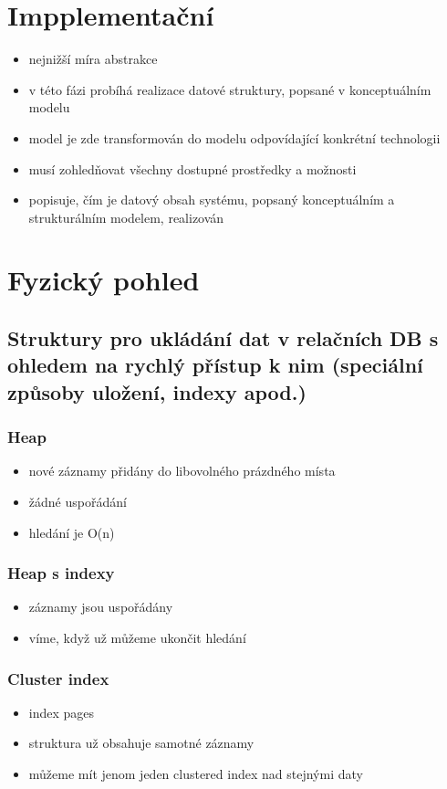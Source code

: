 \documentclass{szzclass}
\begin{document}
\section{Impplementační}
\begin{itemize}
  \item nejnižší míra abstrakce
  \item v této fázi probíhá realizace datové struktury, popsané v konceptuálním modelu
  \item model je zde transformován do modelu odpovídající konkrétní technologii
  \item musí zohledňovat všechny dostupné prostředky a možnosti
  \item popisuje, čím je datový obsah systému, popsaný konceptuálním a strukturálním modelem, realizován
\end{itemize}

\section{Fyzický pohled}
\subsection{Struktury pro ukládání dat v relačních DB s ohledem na rychlý přístup k nim (speciální způsoby uložení, indexy apod.)}
\subsubsection{Heap}
\begin{itemize}
  \item nové záznamy přidány do libovolného prázdného místa
  \item žádné uspořádání
  \item hledání je O(n)
\end{itemize}
\subsubsection{Heap s indexy}
\begin{itemize}
  \item záznamy jsou uspořádány
  \item víme, když už můžeme ukončit hledání
\end{itemize}
\subsubsection{Cluster index}
\begin{itemize}
  \item index pages
  \item struktura už obsahuje samotné záznamy
  \item můžeme mít jenom jeden clustered index nad stejnými daty
\end{itemize}
\end{document}
